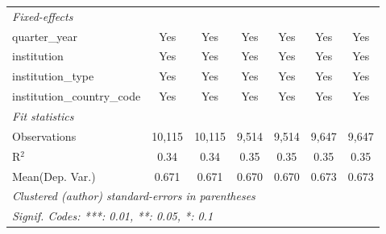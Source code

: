 \begin{tabular}{lcccccc}
   \midrule
   \emph{Fixed-effects}\\
   quarter\_year                      & Yes     & Yes      & Yes     & Yes         & Yes     & Yes\\  
   institution                        & Yes     & Yes      & Yes     & Yes         & Yes     & Yes\\  
   institution\_type                  & Yes     & Yes      & Yes     & Yes         & Yes     & Yes\\  
   institution\_country\_code         & Yes     & Yes      & Yes     & Yes         & Yes     & Yes\\  
   \midrule
   \emph{Fit statistics}\\
   Observations                       & 10,115  & 10,115   & 9,514   & 9,514       & 9,647   & 9,647\\  
   R$^2$                              & 0.34    & 0.34     & 0.35    & 0.35        & 0.35    & 0.35\\  
Mean(Dep. Var.) & 0.671 & 0.671 & 0.670 & 0.670 & 0.673 & 0.673 \\
   \midrule \midrule
   \multicolumn{7}{l}{\emph{Clustered (author) standard-errors in parentheses}}\\
   \multicolumn{7}{l}{\emph{Signif. Codes: ***: 0.01, **: 0.05, *: 0.1}}\\
\end{tabular}
\par\endgroup

